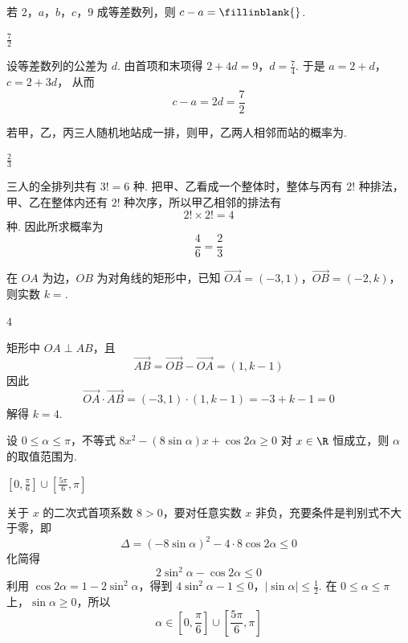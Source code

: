 \begin{problem}
若 \(2\)，\(a\)，\(b\)，\(c\)，\(9\) 成等差数列，则 \(c - a =\fillinblank{}\).
\begin{answer}
\(\frac{7}{2}\)
\end{answer}
\begin{solution}
设等差数列的公差为 \(d\). 由首项和末项得
\(2+4d=9\)，\(d=\frac74\).
于是
\(a=2+d\)，\(c=2+3d\)，
从而
\[
c-a=2d=\frac72
\]
\end{solution}
\end{problem}

\begin{problem}
若甲，乙，丙三人随机地站成一排，则甲，乙两人相邻而站的概率为\fillinblank{}.
\begin{answer}
\(\frac{2}{3}\)
\end{answer}
\begin{solution}
三人的全排列共有 \(3!=6\) 种. 把甲、乙看成一个整体时，整体与丙有 \(2!\) 种排法，甲、乙在整体内还有 \(2!\) 种次序，所以甲乙相邻的排法有
\[
2!\times2!=4
\]
种. 因此所求概率为
\[
\frac46=\frac23
\]
\end{solution}
\end{problem}

\begin{problem}
在 \(OA\) 为边，\(OB\) 为对角线的矩形中，已知 \(\overrightarrow{OA} = (-3, 1)\)，\(\overrightarrow{OB} = (-2, k)\)，则实数 \(k = \)\fillinblank{}.
\begin{answer}
\(4\)
\end{answer}
\begin{solution}
矩形中 \(OA\perp AB\)，且
\[
\overrightarrow{AB}=\overrightarrow{OB}-\overrightarrow{OA}=(1,k-1)
\]
因此
\[
\overrightarrow{OA}\cdot\overrightarrow{AB}
=(-3,1)\cdot(1,k-1)=-3+k-1=0
\]
解得 \(k=4\).
\end{solution}
\end{problem}

\begin{problem}
设 \(0 \leqslant \alpha \leqslant \pi\)，不等式 \(8x^{2} - (8\sin \alpha)x + \cos 2\alpha \geqslant 0\) 对 \(x \in \R\) 恒成立，则 \(\alpha\) 的取值范围为\fillinblank{}.
\begin{answer}
\(\left[0,\frac{\pi}{6}\right]\cup\left[\frac{5\pi}{6},\pi\right]\)
\end{answer}
\begin{solution}
关于 \(x\) 的二次式首项系数 \(8>0\)，要对任意实数 \(x\) 非负，充要条件是判别式不大于零，即
\[
\Delta=(-8\sin\alpha)^2-4\cdot8\cos2\alpha\leqslant0
\]
化简得
\[
2\sin^2\alpha-\cos2\alpha\leqslant0
\]
利用 \(\cos2\alpha=1-2\sin^2\alpha\)，得到
\(4\sin^2\alpha-1\leqslant0\)，\(|\sin\alpha|\leqslant\frac12\).
在 \(0\leqslant\alpha\leqslant\pi\) 上，\(\sin\alpha\geqslant0\)，所以
\[
\alpha\in\left[0,\frac\pi6\right]\cup\left[\frac{5\pi}6,\pi\right]
\]
\end{solution}
\end{problem}

